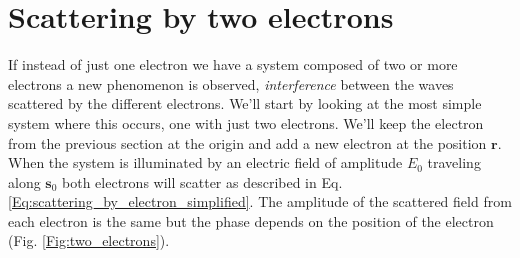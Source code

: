 \section{Scattering by two electrons}\label{diffraction_physics}

If instead of just one electron we have a system composed of two or more
electrons a new phenomenon is observed, {\em interference} between the waves
scattered by the different electrons. We'll start by looking at the most simple
system where this occurs, one with just two electrons. We'll keep the electron
from the previous section at the origin and add a new electron at the position
$\mathbf r$. When the system is illuminated by an electric field of amplitude $E_0$
traveling along $\mathbf s_0$ both electrons will scatter as described in
Eq. \ref{Eq:scattering_by_electron_simplified}. The amplitude of the scattered
field from each electron is the same but the phase depends on the position of
the electron (Fig. \ref{Fig:two_electrons}). 

